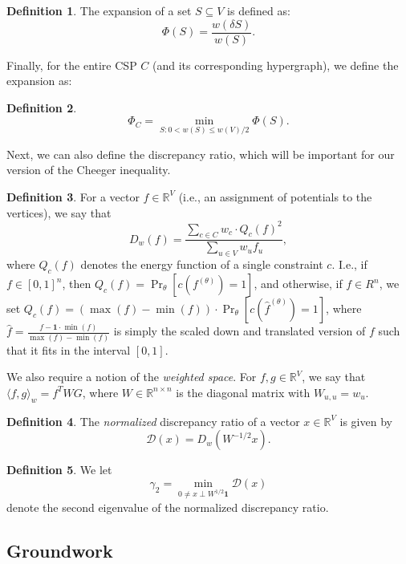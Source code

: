 \documentclass[11pt]{article}
\theoremstyle{definition}
\newtheorem{definition}{Definition}[section]
\newcommand{\R}{\mathbb{R}}
\begin{document}
\begin{definition}
The expansion of a set $S \subseteq V$ is defined as: 
\[
\Phi(S) = \frac{w(\delta S)}{w(S)}.
\]
\end{definition}

Finally, for the entire CSP $C$ (and its corresponding hypergraph), we define the expansion as:

\begin{definition}
    \[
    \Phi_C = \min_{S: 0 < w(S) \leq w(V) / 2} \Phi(S).
    \]
\end{definition}

Next, we can also define the discrepancy ratio, which will be important for our version of the Cheeger inequality.  

\begin{definition}
    For a vector $f \in \R^V$ (i.e., an assignment of potentials to the vertices), we say that 
    \[
    D_w(f) = \frac{\sum_{c \in C} w_c \cdot Q_c(f)^2}{\sum_{u \in V} w_u f_u},
    \]
    where $Q_c(f)$ denotes the energy function of a single constraint $c$. I.e., if $f \in [0,1]^n$, then $Q_c(f) = \Pr_{\theta}[c(f^{(\theta)}) = 1] $, and otherwise, if $f \in R^n$, we set $Q_c(f) = (\max(f) - \min(f)) \cdot \Pr_{\theta}[c(\hat{f}^{(\theta)}) = 1]$, where $\hat{f} = \frac{f - \mathbf{1} \cdot \min(f)}{\max(f) - \min(f)}$ is simply the scaled down and translated version of $f$ such that it fits in the interval $[0,1]$.
\end{definition}

We also require a notion of the \emph{weighted space}. For $f, g \in \R^V$, we say that $\langle f, g \rangle_w = f^T W G$, where $W \in \R^{n \times n}$ is the diagonal matrix with $W_{u,u} = w_u$. 

\begin{definition}
    The \emph{normalized} discrepancy ratio of a vector $x \in \R^V$ is given by 
    \[
    \mathcal{D}(x) = D_w(W^{-1/2} x).
    \]
\end{definition}

\begin{definition}\label{def:eigenvalue}
    We let 
    \[
    \gamma_2 = \min_{0 \neq x \perp W^{1/2} \mathbf{1}} \mathcal{D}(x)
    \]
    denote the second eigenvalue of the normalized discrepancy ratio. 
\end{definition}

\subsection{Groundwork}
\end{document}
